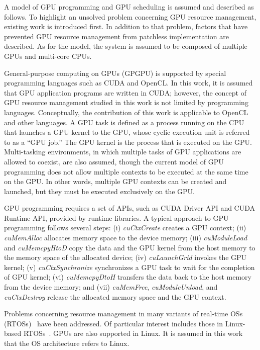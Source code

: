 \label{sec:system_model}
A model of GPU programming and GPU scheduling is assumed and described as follows.
To highlight an unsolved problem concerning GPU resource management, existing work is introduced first.
In addition to that problem, factors that have prevented GPU resource management from patchless implementation are described.
As for the model, the system is assumed to be composed of multiple GPUs and multi-core CPUs.

General-purpose computing on GPUs (GPGPU) is supported by special programming languages such as CUDA and OpenCL.
In this work, it is assumed that GPU application programs are written in CUDA; however, the concept of GPU resource management studied in this work is not limited by programming languages.
Conceptually, the contribution of this work is applicable to OpenCL and other languages.
A GPU task is defined as a process running on the CPU that launches a GPU kernel to the GPU, whose cyclic execution unit is referred to as a ``GPU job.''
The GPU kernel is the process that is executed on the GPU.
Multi-tasking environments, in which multiple tasks of GPU applications are allowed to coexist, are also assumed, though the current model of GPU programming does not allow multiple contexts to be executed at the same time on the GPU.
In other words, multiple GPU contexts can be created and launched, but they must be executed exclusively on the GPU.

GPU programming requires a set of APIs, such as CUDA Driver API and CUDA Runtime API, provided by runtime libraries.
A typical approach to GPU programming follows several steps: (i) \textit{cuCtxCreate} creates a GPU context; (ii) \textit{cuMemAlloc} allocates memory space to the device memory; (iii) \textit{cuModuleLoad} and \textit{cuMemcpyHtoD} copy the data and the GPU kernel from the host memory to the memory space of the allocated device; (iv) \textit{cuLaunchGrid} invokes the GPU kernel; (v) \textit{cuCtxSynchronize} synchronizes a GPU task to wait for the completion of GPU kernel; (vi) \textit{cuMemcpyDtoH} transfers the data back to the host memory from the device memory; and (vii) \textit{cuMemFree}, \textit{cuModuleUnload}, and \textit{cuCtxDestroy} release the allocated memory space and the GPU context.

Problems concerning resource management in many variants of real-time OSs (RTOSs)~\cite{spring,redline,itron,rk} have been addressed.
Of particular interest includes those in Linux-based RTOSs~\cite{litmus,prk,rtai,yodaiken1999rtlinux,kato2009loadable}.
GPUs are also supported in Linux.
It is assumed in this work that the OS architecture refers to Linux.

